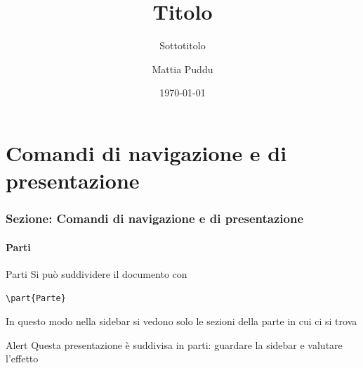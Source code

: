 \documentclass[aspectratio=169, compress]{beamer}
\title[Titolo]{Titolo}
\subtitle{Sottotitolo}
\author[Mattia Puddu]{Mattia Puddu}
\institute{Institute}
\date{\today}
\begin{document}
\begin{frame}[plain]
\maketitle
\Data
\end{frame}

\NoPaginaSezioni

\IndiceParti

    \part{Comandi di navigazione e di presentazione}
    \section{Sezione: Comandi di navigazione e di presentazione}
    \subsection{Parti}
\begin{frame}[fragile]{Parti}
        Si può suddividere il documento con
    \begin{verbatim}\part{Parte}\end{verbatim}
    In questo modo nella sidebar si vedono solo le sezioni della parte in cui ci si trova
    \begin{alertblock}{Alert}
    	Questa presentazione è suddivisa in parti: guardare la sidebar e valutare l'effetto
    \end{alertblock}
\end{frame}
\end{document}
